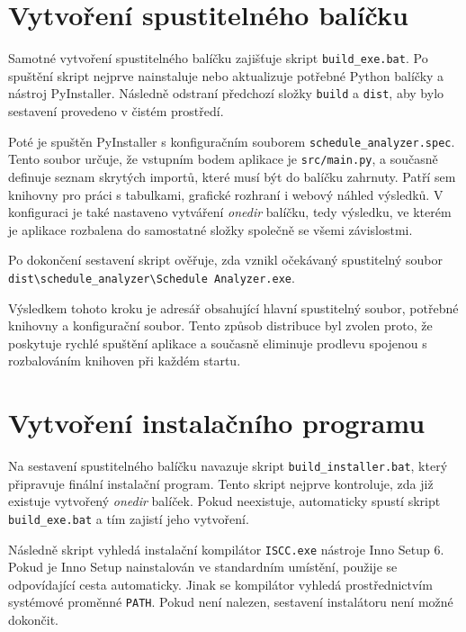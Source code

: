 \documentclass[czech, kiv, ba, he, iso690alph, pdf]{fasthesis}
\begin{document}
		\section{Vytvoření spustitelného balíčku}
	
			Samotné vytvoření spustitelného balíčku zajišťuje skript \texttt{build\_exe.bat}. Po spuštění skript nejprve nainstaluje nebo aktualizuje potřebné Python balíčky a nástroj PyInstaller. Následně odstraní předchozí složky \texttt{build} a \texttt{dist}, aby bylo sestavení provedeno v čistém prostředí.
	
			Poté je spuštěn PyInstaller s konfiguračním souborem \texttt{schedule\_analyzer.spec}. Tento soubor určuje, že vstupním bodem aplikace je \texttt{src/main.py}, a současně definuje seznam skrytých importů, které musí být do balíčku zahrnuty. Patří sem knihovny pro práci s tabulkami, grafické rozhraní i webový náhled výsledků. V konfiguraci je také nastaveno vytváření \textit{onedir} balíčku, tedy výsledku, ve kterém je aplikace rozbalena do samostatné složky společně se všemi závislostmi.
	
			Po dokončení sestavení skript ověřuje, zda vznikl očekávaný spustitelný soubor \texttt{dist\textbackslash schedule\_analyzer\textbackslash Schedule Analyzer.exe}.
	
			Výsledkem tohoto kroku je adresář obsahující hlavní spustitelný soubor, potřebné knihovny a konfigurační soubor. Tento způsob distribuce byl zvolen proto, že poskytuje rychlé spuštění aplikace a současně eliminuje prodlevu spojenou s rozbalováním knihoven při každém startu.
	
		\section{Vytvoření instalačního programu}
	
			Na sestavení spustitelného balíčku navazuje skript \texttt{build\_installer.bat}, který připravuje finální instalační program. Tento skript nejprve kontroluje, zda již existuje vytvořený \textit{onedir} balíček. Pokud neexistuje, automaticky spustí skript \texttt{build\_exe.bat} a tím zajistí jeho vytvoření.
	
			Následně skript vyhledá instalační kompilátor \texttt{ISCC.exe} nástroje Inno Setup 6. Pokud je Inno Setup nainstalován ve standardním umístění, použije se odpovídající cesta automaticky. Jinak se kompilátor vyhledá prostřednictvím systémové proměnné \texttt{PATH}. Pokud není nalezen, sestavení instalátoru není možné dokončit.
	
\end{document}
